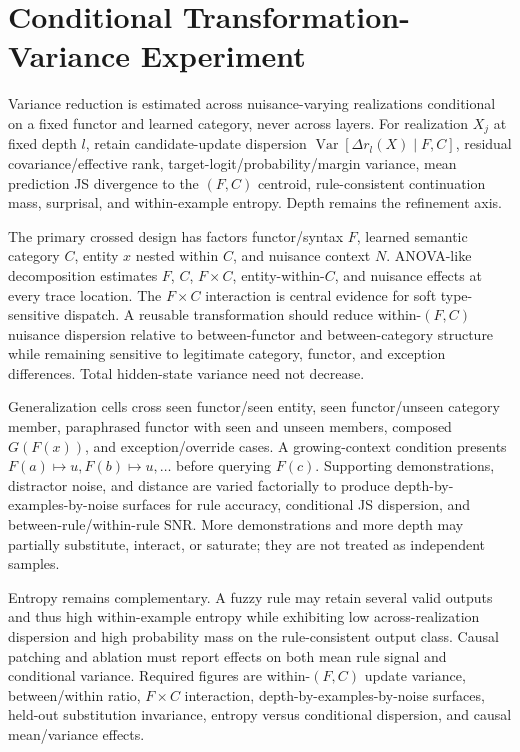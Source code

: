 \documentclass[11pt]{article}
\begin{document}
\section{Conditional Transformation-Variance Experiment}
Variance reduction is estimated across nuisance-varying realizations conditional on a fixed functor and learned category, never across layers. For realization $X_j$ at fixed depth $l$, retain candidate-update dispersion $\operatorname{Var}[\Delta r_l(X)\mid F,C]$, residual covariance/effective rank, target-logit/probability/margin variance, mean prediction JS divergence to the $(F,C)$ centroid, rule-consistent continuation mass, surprisal, and within-example entropy. Depth remains the refinement axis.

The primary crossed design has factors functor/syntax $F$, learned semantic category $C$, entity $x$ nested within $C$, and nuisance context $N$. ANOVA-like decomposition estimates $F$, $C$, $F\times C$, entity-within-$C$, and nuisance effects at every trace location. The $F\times C$ interaction is central evidence for soft type-sensitive dispatch. A reusable transformation should reduce within-$(F,C)$ nuisance dispersion relative to between-functor and between-category structure while remaining sensitive to legitimate category, functor, and exception differences. Total hidden-state variance need not decrease.

Generalization cells cross seen functor/seen entity, seen functor/unseen category member, paraphrased functor with seen and unseen members, composed $G(F(x))$, and exception/override cases. A growing-context condition presents $F(a)\mapsto u,F(b)\mapsto u,\ldots$ before querying $F(c)$. Supporting demonstrations, distractor noise, and distance are varied factorially to produce depth-by-examples-by-noise surfaces for rule accuracy, conditional JS dispersion, and between-rule/within-rule SNR. More demonstrations and more depth may partially substitute, interact, or saturate; they are not treated as independent samples.

Entropy remains complementary. A fuzzy rule may retain several valid outputs and thus high within-example entropy while exhibiting low across-realization dispersion and high probability mass on the rule-consistent output class. Causal patching and ablation must report effects on both mean rule signal and conditional variance. Required figures are within-$(F,C)$ update variance, between/within ratio, $F\times C$ interaction, depth-by-examples-by-noise surfaces, held-out substitution invariance, entropy versus conditional dispersion, and causal mean/variance effects.
\end{document}
